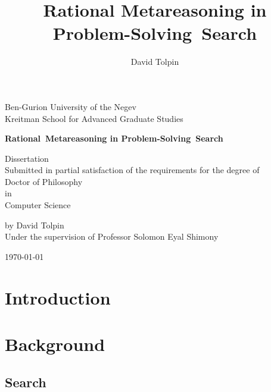 \documentclass[oneside,12pt]{report}
\title {Rational Metareasoning in Problem-Solving~Search}
\author {David Tolpin}
\begin{document}
\begin{titlepage}
\begin{center}
{\large Ben-Gurion University of the Negev
\\
Kreitman School for Advanced Graduate Studies}
\vspace{1in}

{\bf\LARGE Rational~Metareasoning in Problem-Solving~Search}
\vspace{1in}

{\large Dissertation\\
Submitted in partial satisfaction of the requirements for the degree of\\
Doctor of Philosophy\\
in\\
Computer Science
\\
\vspace{1in}

by David Tolpin
\\
Under the supervision of Professor Solomon Eyal Shimony
\\
\vfill

\today}

\vspace{1in}

\end{center}
\end{titlepage}


\setcounter{page}{1}



\setcounter{tocdepth}{5}
\tableofcontents

\newpage
\setcounter{page}{1}

\chapter{Introduction}
\label{ch:intro}


\chapter{Background}
\label{ch:bg}

\section{Search}
\label{sec:search}

\end{document}
